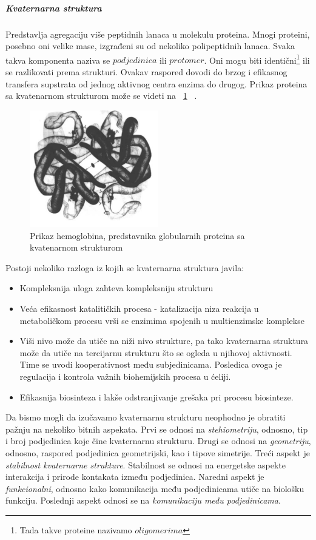 \subparagraph{Kvaternarna struktura}
Predstavlja agregaciju više peptidnih lanaca u molekulu proteina. Mnogi proteini, posebno oni velike mase, izgrađeni su od nekoliko polipeptidnih lanaca. Svaka takva komponenta naziva se $podjedinica$ ili $protomer$. Oni mogu biti identični\footnote{Tada takve proteine nazivamo $oligomerima$} ili se razlikovati prema strukturi. Ovakav raspored dovodi do brzog i efikasnog transfera supstrata od jednog aktivnog centra enzima do drugog. Prikaz proteina sa kvatenarnom strukturom može se videti na ~\ref{fig:hemoglobin} ~\cite{spasic,medbio}.
\begin{figure}[h]
	\centering
    \includegraphics[width=0.5\textwidth]{Figures/BO/hemoglobin.png}
    \caption{Prikaz hemoglobina, predstavnika globularnih proteina sa kvatenarnom strukturom~\cite{Principi}}
    \label{fig:hemoglobin}
\end{figure}  
Postoji nekoliko razloga iz kojih se kvaternarna struktura javila:
\begin{itemize}
\item Kompleksnija uloga zahteva kompleksniju strukturu 
\item Veća efikasnost katalitičkih procesa - katalizacija niza reakcija u metaboličkom procesu vrši se enzimima spojenih u multienzimske komplekse
\item Viši nivo može da utiče na niži nivo strukture, pa tako kvaternarna struktura može da utiče na tercijarnu strukturu što se ogleda u njihovoj aktivnosti. Time se uvodi kooperativnost među subjedinicama. Posledica ovoga je regulacija i kontrola važnih biohemijskih procesa u ćeliji. 
\item Efikasnija biosinteza i lakše odstranjivanje grešaka pri procesu biosinteze.
\end{itemize}
 Da bismo mogli da izučavamo kvaternarnu strukturu neophodno je obratiti pažnju na nekoliko bitnih aspekata. Prvi se odnosi na \textit{stehiometriju}, odnosno, tip i broj podjedinica koje čine kvaternarnu strukturu. Drugi se odnosi na \textit{geometriju}, odnosno, raspored podjedinica geometrijski, kao i tipove simetrije. Treći aspekt je \textit{stabilnost kvaternarne strukture}. Stabilnost se odnosi na energetske aspekte interakcija i prirode kontakata između podjedinica. Naredni aspekt je \textit{funkcionalni}, odnosno kako komunikacija među podjedinicama utiče na biološku funkciju. Poslednji aspekt odnosi se na \textit{komunikaciju među podjedinicama}. ~\cite{Principi}
 
